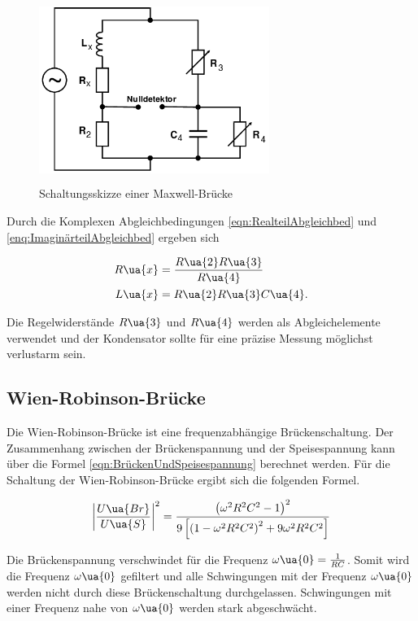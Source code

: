 \begin{figure}
  \includegraphics[width=7.50cm, height=6cm]{V302_MaxwellBrücke.png}
  \caption{Schaltungsskizze einer Maxwell-Brücke\cite{anleitung01}}
  \label{fig:Maxwell-Brücke}
\end{figure}

Durch die Komplexen Abgleichbedingungen \eqref{eqn:RealteilAbgleichbed} und
\eqref{enq:ImaginärteilAbgleichbed} ergeben sich

\begin{align}
  R\ua{x} &= \frac{R\ua{2}R\ua{3}}{R\ua{4}}\label{eqn:Maxwell_Rx}\\
  L\ua{x} &= R\ua{2}R\ua{3}C\ua{4}.\label{eqn:Maxwell_Lx}
\end{align}

Die Regelwiderstände $R\ua{3}$ und $R\ua{4}$ werden als Abgleichelemente verwendet
und der Kondensator sollte für eine präzise Messung möglichst verlustarm sein.

\subsection{Wien-Robinson-Brücke}
Die Wien-Robinson-Brücke ist eine frequenzabhängige Brückenschaltung. Der Zusammenhang
zwischen der Brückenspannung und der Speisespannung kann über die Formel
\eqref{eqn:BrückenUndSpeisespannung} berechnet werden. Für die Schaltung der
Wien-Robinson-Brücke ergibt sich die folgenden Formel.

\begin{equation}
  \label{eqn:Wien-Robinson-Brücke}
  \left|\frac{U\ua{Br}}{U\ua{S}}\right|^2 = \frac{\left(\omega^2R^2C^2 - 1\right)^2}{
  9\left[\left(1 - \omega^2R^2C^2\right)^2 + 9\omega^2R^2C^2\right]}
\end{equation}

Die Brückenspannung verschwindet für die Frequenz $\omega\ua{0} = \frac{1}{RC}$.
Somit wird die Frequenz $\omega\ua{0}$ gefiltert und alle Schwingungen mit
der Frequenz $\omega\ua{0}$ werden nicht durch diese Brückenschaltung durchgelassen.
Schwingungen mit einer Frequenz nahe von $\omega\ua{0}$ werden stark abgeschwächt.

